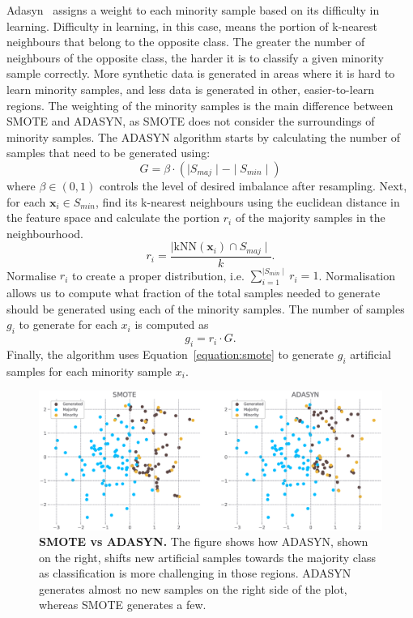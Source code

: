 Adasyn~\cite{adasyn} assigns a weight to each minority sample based on its difficulty in learning.
Difficulty in learning, in this case, means the portion of k-nearest neighbours that belong to the
opposite class. The greater the number of neighbours of the opposite class, the harder it is to
classify a given minority sample correctly. More synthetic data is generated in areas where it is
hard to learn minority samples, and less data is generated in other, easier-to-learn regions. The
weighting of the minority samples is the main difference between SMOTE and ADASYN, as SMOTE does
not consider the surroundings of minority samples. The ADASYN algorithm starts by calculating the
number of samples that need to be generated using:
\begin{equation}
    G = \beta \cdot (\mid S_{maj} \mid - \mid S_{min} \mid)
\end{equation}
where $\beta \in (0, 1)$ controls the level of desired imbalance after resampling. Next, for each
$\mathbf{x}_i \in S_{min}$, find its k-nearest neighbours using the euclidean distance in the
feature space and calculate the portion $r_i$ of the majority samples in the neighbourhood.
\begin{equation}
    r_i = \frac{\mid \mathrm{kNN}(\mathbf{x}_i) \cap S_{maj} \mid}{k}.
\end{equation}
Normalise $r_i$ to create a proper distribution, i.e. $\sum_{i = 1}^{\mid S_{min} \mid} r_i = 1$.
Normalisation allows us to compute what fraction of the total samples needed to generate should be
generated using each of the minority samples. The number of samples $g_i$ to generate for each
$x_i$ is computed as
\begin{equation}
    g_i = r_i \cdot G.
\end{equation}
Finally, the algorithm uses Equation~\ref{equation:smote} to generate $g_i$ artificial samples for
each minority sample $x_i$.

\begin{figure}
    \centering
    \includegraphics[width=\linewidth]{figures/smote_vs_adasyn.eps}
    \caption{
        \textbf{SMOTE vs ADASYN.} The figure shows how ADASYN, shown on the right, shifts new
        artificial samples towards the majority class as classification is more challenging in
        those regions. ADASYN generates almost no new samples on the right side of the plot,
        whereas SMOTE generates a few.
    }
    \label{figure:smote-vs-adasyn}
\end{figure}
